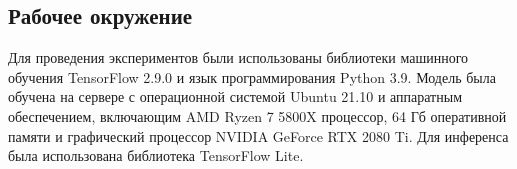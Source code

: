\subsection{Рабочее окружение}\label{sect-5-1}

Для проведения экспериментов были использованы библиотеки машинного обучения TensorFlow 2.9.0 и язык программирования Python 3.9. Модель была обучена на сервере с операционной системой Ubuntu 21.10 и аппаратным обеспечением, включающим AMD Ryzen 7 5800X процессор, 64 Гб оперативной памяти и графический процессор NVIDIA GeForce RTX 2080 Ti. Для инференса была использована библиотека TensorFlow Lite.
